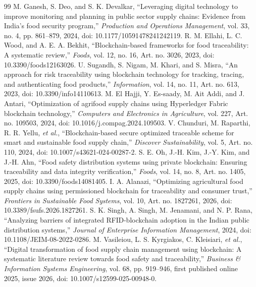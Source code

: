 \documentclass[conference,a4paper]{IEEEtran}
\begin{document}
\begin{thebibliography}{99}
 M. Ganesh, S. Deo, and S. K. Devalkar, ``Leveraging digital technology to improve monitoring and planning in public sector supply chains: Evidence from India's food security program,'' \textit{Production and Operations Management}, vol. 33, no. 4, pp. 861--879, 2024, doi: 10.1177/10591478241242119.
 R. M. Ellahi, L. C. Wood, and A. E. A. Bekhit, ``Blockchain-based frameworks for food traceability: A systematic review,'' \textit{Foods}, vol. 12, no. 16, Art. no. 3026, 2023, doi: 10.3390/foods12163026.
 U. Sugandh, S. Nigam, M. Khari, and S. Misra, ``An approach for risk traceability using blockchain technology for tracking, tracing, and authenticating food products,'' \textit{Information}, vol. 14, no. 11, Art. no. 613, 2023, doi: 10.3390/info14110613.
 M. El Hajji, Y. Es-saady, M. Ait Addi, and J. Antari, ``Optimization of agrifood supply chains using Hyperledger Fabric blockchain technology,'' \textit{Computers and Electronics in Agriculture}, vol. 227, Art. no. 109503, 2024, doi: 10.1016/j.compag.2024.109503.
 V. Chunduri, M. Raparthi, R. R. Yellu, \textit{et al.}, ``Blockchain-based secure optimized traceable scheme for smart and sustainable food supply chain,'' \textit{Discover Sustainability}, vol. 5, Art. no. 110, 2024, doi: 10.1007/s43621-024-00287-2.
 S. E. Oh, J.-H. Kim, J.-Y. Kim, and J.-H. Ahn, ``Food safety distribution systems using private blockchain: Ensuring traceability and data integrity verification,'' \textit{Foods}, vol. 14, no. 8, Art. no. 1405, 2025, doi: 10.3390/foods14081405.
 I. A. Alanazi, ``Optimizing agricultural food supply chains using permissioned blockchain for traceability and consumer trust,'' \textit{Frontiers in Sustainable Food Systems}, vol. 10, Art. no. 1827261, 2026, doi: 10.3389/fsufs.2026.1827261.
 S. K. Singh, A. Singh, M. Jenamani, and N. P. Rana, ``Analyzing barriers of integrated RFID-blockchain adoption in the Indian public distribution systems,'' \textit{Journal of Enterprise Information Management}, 2024, doi: 10.1108/JEIM-08-2022-0286.
 M. Vasileiou, L. S. Kyrgiakos, C. Kleisiari, \textit{et al.}, ``Digital transformation of food supply chain management using blockchain: A systematic literature review towards food safety and traceability,'' \textit{Business \& Information Systems Engineering}, vol. 68, pp. 919--946, first published online 2025, issue 2026, doi: 10.1007/s12599-025-00948-0.

\end{thebibliography}
\end{document}
